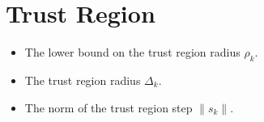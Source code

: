 \documentclass[letterpaper,10pt,english]{sphinxmanual}
\begin{document}
\section{Trust Region}
\label{\detokenize{diagnostic:trust-region}}\begin{itemize}
\item {} 
\sphinxAtStartPar
{} \sphinxhyphen{} The lower bound on the trust region radius \(\rho_k\).

\item {} 
\sphinxAtStartPar
{} \sphinxhyphen{} The trust region radius \(\Delta_k\).

\item {} 
\sphinxAtStartPar
{} \sphinxhyphen{} The norm of the trust region step \(\|s_k\|\).

\end{itemize}
\end{document}
